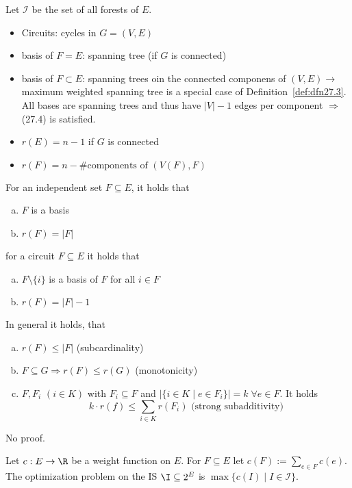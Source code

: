 \begin{xmp+}
Let $\mathcal{I}$ be the set of all forests of $E$.
\begin{itemize}
\item Circuits: cycles in $G = (V, E)$
\item basis of $F = E$: spanning tree (if $G$ is connected)
\item basis of $F \subset E$: spanning trees oin the connected componens of
$(V,E) \rightarrow$ maximum weighted spanning tree is a special case of
Definition~\ref{def:dfn27.3}. All bases are spanning trees and thus have
$|V|-1$ edges per component $\Rightarrow$ (27.4) is satisfied.
\item $r(E) = n-1$ if $G$ is connected
\item $r(F) = n- \text{\#components of } (V(F), F)$
\end{itemize}
\end{xmp+}

\begin{lem}\label{lem:lem27.2}
For an independent set $F \subseteq E$, it holds that
\begin{enumerate}[(a)]
\item $F$ is a basis
\item $r(F) = |F|$
\end{enumerate}
for a circuit $F \subseteq E$ it holds that
\begin{enumerate}[(a)]
\item $F \setminus \{i\}$ is a basis of $F$ for all $i \in F$
\item $r(F) = |F| - 1$
\end{enumerate}
In general it holds, that 
\begin{enumerate}[(a)]
\item $r(F) \leq |F|$ (subcardinality)
\item $F \subseteq G \Rightarrow r(F) \leq r(G)$ (monotonicity)
\item $F, F_i$ $(i \in K)$ with $F_i \subseteq F$ and $| \{ i \in K \mid e
\in F_i \}| = k \;\forall e \in F$.
It holds
\[
	k \cdot r(f) \leq \sum_{i \in K} r(F_i) \text{ (strong subadditivity)}
\]
\end{enumerate}
No proof.
\end{lem}

\begin{defn}\label{def:defn27.3}
Let $c : E \rightarrow \R$ be a weight function on $E$. For $F \subseteq E$
let $c(F) := \sum_{e \in F} c(e)$. The optimization problem on the IS $\I
\subseteq 2^E$ is $\max \{ c(I) \mid I \in \mathcal{I}\}$.
\end{defn}

